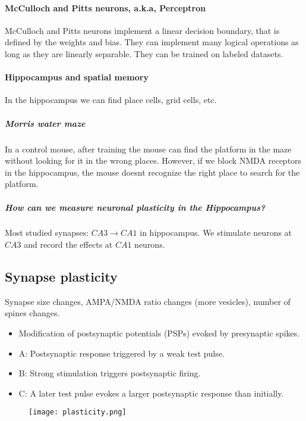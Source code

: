 \documentclass[main]{subfiles}
\begin{document}
\paragraph{McCulloch and Pitts neurons, a.k.a, Perceptron}
McCulloch and Pitts neurons implement a linear decision boundary, that is defined by the weights and bias. They can implement many logical operations as long as they are linearly separable. They can be trained on labeled datasets.

\paragraph{Hippocampus and spatial memory}

In the hippocampus we can find place cells, grid cells, etc.

\subparagraph{Morris water maze}
In a control mouse, after training the mouse can find the platform in the maze without looking for it in the wrong places. However, if we block NMDA receptors in the hippocampus, the mouse doesnt recognize the right place to search for the platform.

\subparagraph{How can we measure neuronal plasticity in the Hippocampus?}
Most studied synapses: $CA3 \rightarrow CA1$ in hippocampus. We stimulate neurons at $CA3$ and record the effects at $CA1$ neurons.

\subsection{Synapse plasticity}
Synapse size changes, AMPA/NMDA ratio changes (more vesicles), number of spines changes.

\begin{itemize}[noitemsep,nolistsep]
	\item Modification of postsynaptic potentials (PSPs) evoked by presynaptic spikes.
	\item A: Postsynaptic response triggered by a weak test pulse.
	\item B: Strong stimulation triggers postsynaptic firing.
	\item C: A later test pulse evokes a larger postsynaptic response than initially.
\end{itemize}

\begin{figure}[H]
	\centering
	\texttt{[image: plasticity.png]}
\end{figure}
\end{document}

